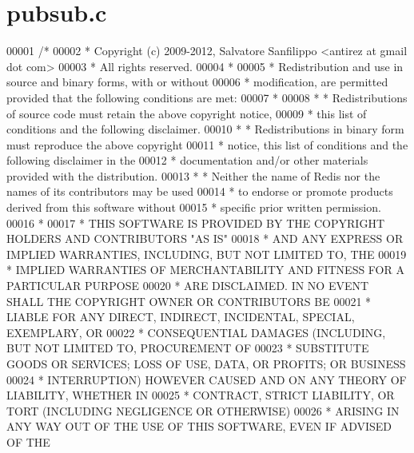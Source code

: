 \hypertarget{pubsub_8c_source}{}\section{pubsub.\+c}
\label{pubsub_8c_source}

\begin{DoxyCode}
00001 \textcolor{comment}{/*}
00002 \textcolor{comment}{ * Copyright (c) 2009-2012, Salvatore Sanfilippo <antirez at gmail dot com>}
00003 \textcolor{comment}{ * All rights reserved.}
00004 \textcolor{comment}{ *}
00005 \textcolor{comment}{ * Redistribution and use in source and binary forms, with or without}
00006 \textcolor{comment}{ * modification, are permitted provided that the following conditions are met:}
00007 \textcolor{comment}{ *}
00008 \textcolor{comment}{ *   * Redistributions of source code must retain the above copyright notice,}
00009 \textcolor{comment}{ *     this list of conditions and the following disclaimer.}
00010 \textcolor{comment}{ *   * Redistributions in binary form must reproduce the above copyright}
00011 \textcolor{comment}{ *     notice, this list of conditions and the following disclaimer in the}
00012 \textcolor{comment}{ *     documentation and/or other materials provided with the distribution.}
00013 \textcolor{comment}{ *   * Neither the name of Redis nor the names of its contributors may be used}
00014 \textcolor{comment}{ *     to endorse or promote products derived from this software without}
00015 \textcolor{comment}{ *     specific prior written permission.}
00016 \textcolor{comment}{ *}
00017 \textcolor{comment}{ * THIS SOFTWARE IS PROVIDED BY THE COPYRIGHT HOLDERS AND CONTRIBUTORS "AS IS"}
00018 \textcolor{comment}{ * AND ANY EXPRESS OR IMPLIED WARRANTIES, INCLUDING, BUT NOT LIMITED TO, THE}
00019 \textcolor{comment}{ * IMPLIED WARRANTIES OF MERCHANTABILITY AND FITNESS FOR A PARTICULAR PURPOSE}
00020 \textcolor{comment}{ * ARE DISCLAIMED. IN NO EVENT SHALL THE COPYRIGHT OWNER OR CONTRIBUTORS BE}
00021 \textcolor{comment}{ * LIABLE FOR ANY DIRECT, INDIRECT, INCIDENTAL, SPECIAL, EXEMPLARY, OR}
00022 \textcolor{comment}{ * CONSEQUENTIAL DAMAGES (INCLUDING, BUT NOT LIMITED TO, PROCUREMENT OF}
00023 \textcolor{comment}{ * SUBSTITUTE GOODS OR SERVICES; LOSS OF USE, DATA, OR PROFITS; OR BUSINESS}
00024 \textcolor{comment}{ * INTERRUPTION) HOWEVER CAUSED AND ON ANY THEORY OF LIABILITY, WHETHER IN}
00025 \textcolor{comment}{ * CONTRACT, STRICT LIABILITY, OR TORT (INCLUDING NEGLIGENCE OR OTHERWISE)}
00026 \textcolor{comment}{ * ARISING IN ANY WAY OUT OF THE USE OF THIS SOFTWARE, EVEN IF ADVISED OF THE}

\end{DoxyCode}
